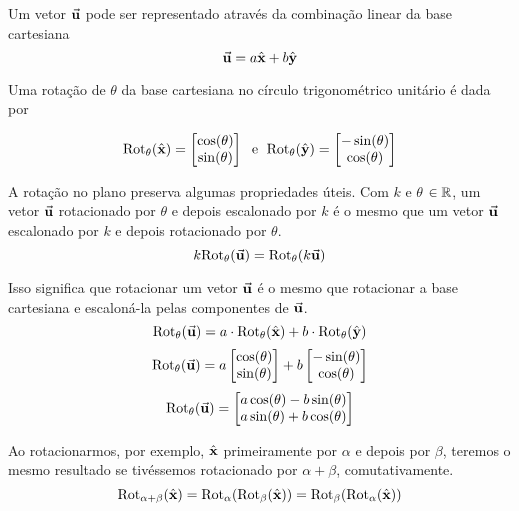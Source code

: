 \documentclass[12pt, a4paper]{article}
\begin{document}
    

    Um vetor $\Vec{\textbf{u}}$ pode ser representado através da combinação linear da base cartesiana
    \[\Vec{\textbf{u}}=a\hat{\textbf{x}}+b\hat{\textbf{y}}\]

    Uma rotação de $\theta$ da base cartesiana no círculo trigonométrico unitário é dada por
    
    \[
        \text{Rot}_\theta(\hat{\textbf{x}})=
        \begin{bmatrix}
            \cos(\theta)\\
            \sin(\theta)
        \end{bmatrix}
        \;\text{ e }\;
        \text{Rot}_\theta(\hat{\textbf{y}})=
        \begin{bmatrix}
            -\sin(\theta)\\
            \cos(\theta)
        \end{bmatrix}
    \]
    
    A rotação no plano preserva algumas propriedades úteis. Com $k$ e $\theta$ $\in\mathbb{R}$, um vetor $\Vec{\textbf{u}}$ rotacionado por $\theta$ e depois escalonado por $k$ é o mesmo que um vetor $\Vec{\textbf{u}}$ escalonado por $k$ e depois rotacionado por $\theta$.
    \[k\text{Rot}_\theta(\Vec{\textbf{u}})=\text{Rot}_\theta(k\Vec{\textbf{u}})\]

    Isso significa que rotacionar um vetor $\Vec{\textbf{u}}$ é o mesmo que rotacionar a base cartesiana e escaloná-la pelas componentes de $\Vec{\textbf{u}}$.
    \[\text{Rot}_\theta(\Vec{\textbf{u}})=a\cdot\text{Rot}_\theta(\hat{\textbf{x}})+b\cdot\text{Rot}_\theta(\hat{\textbf{y}})\]
    \[
        \text{Rot}_\theta(\Vec{\textbf{u}})=
        a
        \begin{bmatrix}
            \cos(\theta)\\
            \sin(\theta)
        \end{bmatrix}
        +
        b
        \begin{bmatrix}
            -\sin(\theta)\\
            \cos(\theta)
        \end{bmatrix}
    \]
    \begin{equation}
        \label{equacao-rocatao-vetor}
        \text{Rot}_\theta(\Vec{\textbf{u}})=
        \begin{bmatrix}
            a\cos(\theta)-b\sin(\theta)\\
            a\sin(\theta)+b\cos(\theta)
        \end{bmatrix}
    \end{equation}
    
    Ao rotacionarmos, por exemplo, $\hat{\textbf{x}}$ primeiramente por $\alpha$ e depois por $\beta$, teremos o mesmo resultado se tivéssemos rotacionado por $\alpha+\beta$, comutativamente.
    \[
        \text{Rot}_{\alpha+\beta}(\hat{\textbf{x}})=\text{Rot}_\alpha(\text{Rot}_\beta(\hat{\textbf{x}}))=\text{Rot}_\beta(\text{Rot}_\alpha(\hat{\textbf{x}}))
    \]
    
\end{document}
